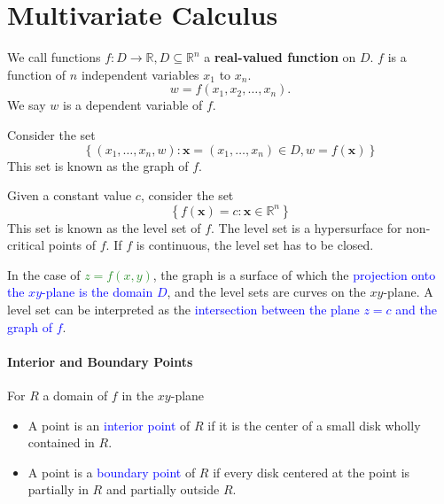 \section{Multivariate Calculus}
We call functions $f:D\to\mathbb{R}, D\subseteq \mathbb{R}^{n}$ a
\textbf{real-valued function} on $D$. $f$ is a \textcolor{Bittersweet}{function
of $n$ independent variables} $x_1$ to $x_{n}$.
\[w=f\left( x_1,x_2,\ldots,x_{n} \right).\] 
We say $w$ is a \textcolor{Bittersweet}{dependent variable} of $f$.

Consider the set
\[\left\{ \left( x_1,\ldots,x_{n}, w \right) : \mathbf{x}=\left(
x_1,\ldots,x_{n} \right) \in D,w= f(\mathbf{x}) \right\}\]
This set is known as the \textcolor{Bittersweet}{graph} of $f$.

Given a constant value $c$, consider the set 
\[\left\{ f(\mathbf{x})=c : \mathbf{x}\in \mathbb{R}^{n}\right\}\]
This set is known as the
\textcolor{Bittersweet}{level set} of $f$. The level set is a hypersurface for
non-critical points of $f$. If $f$ is continuous, the level set has to be
closed.

In the case of \textcolor{ForestGreen}{$z=f(x,y)$}, the graph is a surface of
which the \textcolor{Blue}{projection onto the $xy$-plane is the domain $D$},
and the level sets are curves on the $xy$-plane. A level set can be interpreted
as the \textcolor{Blue}{intersection between the plane $z=c$ and the graph of
$f$}.

\paragraph{Interior and Boundary Points}
For $R$ a domain of $f$ in the $xy$-plane
\begin{itemize}
  \item A point is an \textcolor{Blue}{interior point} of $R$ if it is
    the center of a small disk wholly contained in $R$.
  \item A point is a \textcolor{Blue}{boundary point} of $R$ if every disk centered
    at the point is partially in $R$ and partially outside $R$.
\end{itemize}

